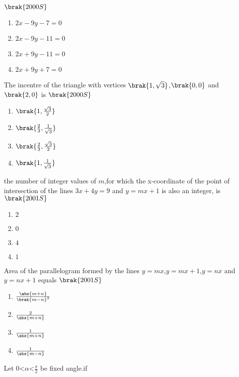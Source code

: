 \hfill{$\brak{2000S}$}
\begin{enumerate}

      \item $2x-9y-7=0$  
      \item $2x-9y-11=0$
      \item $2x+9y-11=0$
      \item $2x+9y+7=0$

\end{enumerate}
\item The incentre of the triangle with vertices $\brak{1,\sqrt{3}}$,$\brak{0,0}$ and $\brak{2,0}$ is 
\hfill{$\brak{2000S}$}
\begin{enumerate}
    
     \item $\brak{1,\frac{\sqrt{3}}{2}}$
     \item $\brak{\frac{2}{3},\frac{1}{\sqrt{3}}}$
     \item $\brak{\frac{2}{3},\frac{\sqrt{3}}{2}}$
     \item $\brak{1,\frac{1}{\sqrt{3}}}$
    
\end{enumerate}
\item the number of integer values of $m$,for which the x-coordinate of the point of intersection of the lines $3x+4y=9$ and $y=mx+1$ is also an integer, is 
\hfill{$\brak{2001S}$}
\begin{enumerate}
    
    \item $2$
    \item $0$
     \item $4$
     \item $1$
    
\end{enumerate}
\item Area of the parallelogram formed by the lines $y=mx$,$y=mx+1$,$y=nx$ and $y=nx+1$ equals
\hfill{$\brak{2001S}$}
\begin{enumerate}
    
     \item $\frac{\abs{m+n}}{\brak{m-n}^2}$
     \item $\frac{2}{\abs{m+n}}$
     \item $\frac{1}{\abs{m+n}}$
     \item $\frac{1}{\abs{m-n}}$
    
\end{enumerate}
\item Let $0$\textless $\alpha $\textless $\frac{\pi}{2}$ be fixed angle.if\\
